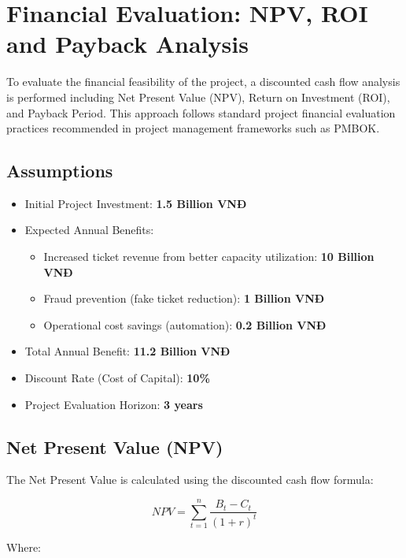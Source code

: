 \section{Financial Evaluation: NPV, ROI and Payback Analysis}

To evaluate the financial feasibility of the project, a discounted cash flow analysis is performed including Net Present Value (NPV), Return on Investment (ROI), and Payback Period. This approach follows standard project financial evaluation practices recommended in project management frameworks such as PMBOK.

\subsection{Assumptions}

\begin{itemize}
    \item Initial Project Investment: \textbf{1.5 Billion VNĐ}
    \item Expected Annual Benefits:
        \begin{itemize}
            \item Increased ticket revenue from better capacity utilization: \textbf{10 Billion VNĐ}
            \item Fraud prevention (fake ticket reduction): \textbf{1 Billion VNĐ}
            \item Operational cost savings (automation): \textbf{0.2 Billion VNĐ}
        \end{itemize}
    \item Total Annual Benefit: \textbf{11.2 Billion VNĐ}
    \item Discount Rate (Cost of Capital): \textbf{10\%}
    \item Project Evaluation Horizon: \textbf{3 years}
\end{itemize}

\subsection{Net Present Value (NPV)}

The Net Present Value is calculated using the discounted cash flow formula:

\begin{center}
    {\Large
    \[
    NPV = \sum_{t=1}^{n} \frac{B_t - C_t}{(1+r)^t}
    \]
    }
\end{center}

Where:

